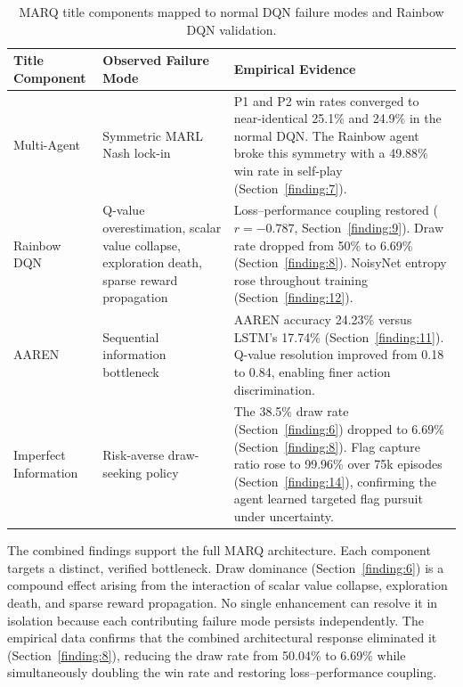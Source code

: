 \begin{table}[htbp]
    \centering
    \caption{MARQ title components mapped to normal DQN failure modes and Rainbow DQN validation.}
    \label{tab:title_evidence}
    \begin{tabular}{|p{2.8cm}|p{4.5cm}|p{6.5cm}|}
        \hline
        \textbf{Title Component} & \textbf{Observed Failure Mode} & \textbf{Empirical Evidence} \\
        \hline
        Multi-Agent & Symmetric MARL Nash lock-in & P1 and P2 win rates converged to near-identical 25.1\% and 24.9\% in the normal DQN. The Rainbow agent broke this symmetry with a 49.88\% win rate in self-play (Section~\ref{finding:7}). \\
        \hline
        Rainbow DQN & Q-value overestimation, scalar value collapse, exploration death, sparse reward propagation & Loss--performance coupling restored ($r = -0.787$, Section~\ref{finding:9}). Draw rate dropped from 50\% to 6.69\% (Section~\ref{finding:8}). NoisyNet entropy rose throughout training (Section~\ref{finding:12}). \\
        \hline
        AAREN & Sequential information bottleneck & AAREN accuracy 24.23\% versus LSTM's 17.74\% (Section~\ref{finding:11}). Q-value resolution improved from 0.18 to 0.84, enabling finer action discrimination. \\
        \hline
        Imperfect Information & Risk-averse draw-seeking policy & The 38.5\% draw rate (Section~\ref{finding:6}) dropped to 6.69\% (Section~\ref{finding:8}). Flag capture ratio rose to 99.96\% over 75k episodes (Section~\ref{finding:14}), confirming the agent learned targeted flag pursuit under uncertainty. \\
        \hline
    \end{tabular}
\end{table}

The combined findings support the full MARQ architecture. Each component targets a distinct, verified bottleneck. Draw dominance (Section~\ref{finding:6}) is a compound effect arising from the interaction of scalar value collapse, exploration death, and sparse reward propagation. No single enhancement can resolve it in isolation because each contributing failure mode persists independently. The empirical data confirms that the combined architectural response eliminated it (Section~\ref{finding:8}), reducing the draw rate from 50.04\% to 6.69\% while simultaneously doubling the win rate and restoring loss--performance coupling.


